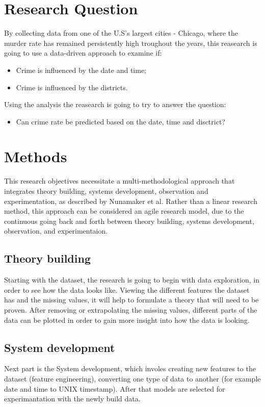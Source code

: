 \documentclass[a4paper, twocolumn]{article}
\begin{document}
\section{Research Question}
By collecting data from one of the U.S's largest cities - Chicago,
where the murder rate has remained persistently high troughout the years\cite{friedman2017crime},
this reasearch is going to use a data-driven approach to examine if:
\begin{itemize}
    \item Crime is influenced by the date and time;
    \item Crime is influenced by the districts.
\end{itemize}
Using the analysis the reasearch is going to try to answer the question:
\begin{itemize}
    \item Can crime rate be predicted based on the date, time and disctrict?
\end{itemize}

\section{Methods}

This research objectives necessitate a multi-methodological approach that integrates theory building, systems development, observation and experimentation, as described by Nunamaker et al\cite{nunamaker1990systems}.
Rather than a linear research method, this approach can be considered an agile research model, due to the continuous going back and forth between theory building, systems development, observation, and experimentaion.

\subsection{Theory building}
\label{theorybuilding}
    Starting with the dataset\cite{dataset}, the research is going to begin with data exploration,
    in order to see how the data looks like. Viewing the different features the dataset has and the missing
    values, it will help to formulate a theory that will need to be proven.
    After removing or extrapolating the missing values, different parts of the data can be plotted in order
    to gain more insight into how the data is looking.
\subsection{System development}
\label{systemdevelopment}
    Next part is the System development, which involes creating new features to the dataset (feature engineering),
    converting one type of data to another (for example date and time to UNIX timestamp).
    After that models are selected for experimantation with the newly build data.
\end{document}
